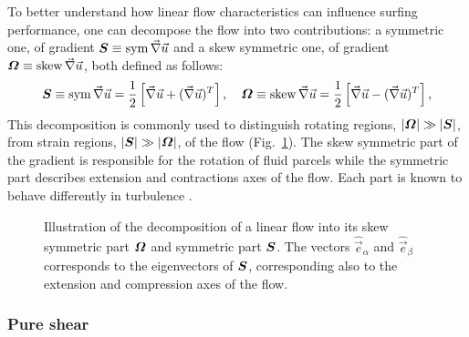 To better understand how linear flow characteristics can influence surfing performance, one can decompose the flow into two contributions: a symmetric one, of gradient $\boldsymbol{S} \equiv \operatorname{sym} \vec{\nabla} \vec{u}$ and a skew symmetric one, of gradient $\boldsymbol{\varOmega} \equiv \operatorname{skew} \vec{\nabla} \vec{u}$, both defined as follows:
\begin{equation}\label{eq:sym_def}
	\boldsymbol{S} \equiv \operatorname{sym} \vec{\nabla} \vec{u} = \frac{1}{2} \left[ \vec{\nabla} \vec{u} + (\vec{\nabla} \vec{u})^T \right], \quad \boldsymbol{\varOmega} \equiv \operatorname{skew} \vec{\nabla} \vec{u} = \frac{1}{2} \left[ \vec{\nabla} \vec{u} - (\vec{\nabla} \vec{u})^T \right],
\end{equation}
This decomposition is commonly used to distinguish rotating regions, $\lvert\boldsymbol{\varOmega}\rvert \gg \lvert\boldsymbol{S}\rvert$, from strain regions, $\lvert\boldsymbol{S}\rvert \gg \lvert\boldsymbol{\varOmega}\rvert$, of the flow (Fig.~\ref{fig:decomposition}).
The skew symmetric part of the gradient is responsible for the rotation of fluid parcels while the symmetric part describes extension and contractions axes of the flow.
Each part is known to behave differently in turbulence \citep{meneveau2011lagrangian, fang2015short}.
\begin{figure}%
	\centering
	
	\caption[Illustration of the decomposition of a linear flow into its skew symmetric part $\GradientsAsym$ and symmetric part $\GradientsSym$.]{
		Illustration of the decomposition of a linear flow into its skew symmetric part $\GradientsAsym$ and symmetric part $\GradientsSym$. The vectors $\hat{\vec{e}}_\alpha$ and $\hat{\vec{e}}_\beta$ corresponds to the eigenvectors of $\GradientsSym$, corresponding also to the extension and compression axes of the flow.
	}
	\label{fig:decomposition}
\end{figure}

\subsubsection{Pure shear}\label{sec:the_surfing_strategy_linear_sym}

